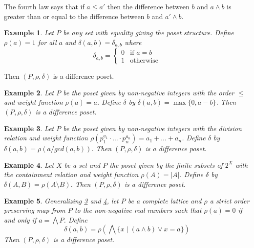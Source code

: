 \documentclass[acmsmall,review,anonymous]{acmart}\settopmatter{printfolios=true,printccs=false,printacmref=false}
\newtheorem{example}{Example}
\begin{document}
The fourth law says that if $a \leq a'$ then the difference between $b$
and $a \wedge b$ is greater than or equal to the difference between $b$ and $a'
\wedge b$.
\fi
\begin{example}\label{embedding}
Let $P$ be any set with equality giving the poset structure. Define
$\rho(a) = 1$ for all $a$ and $\delta(a, b) = \delta_{a, b}$ where
$$\delta_{a, b} =
\begin{cases}
0 & \text{if } a = b\\
1 & \text{otherwise}
\end{cases}$$
\end{example}
Then $(P, \rho, \delta)$ is a difference poset.
\begin{example}\label{naturalnumbers}
Let $P$ be the poset given by non-negative integers with the order $\leq$ and
weight function $\rho(a) = a$. Define $\delta$ by $\delta(a, b) = \max\{0,
a-b\}$. Then $(P, \rho, \delta)$ is a difference poset.
\end{example}
\begin{example}\label{divisibility}
Let $P$ be the poset given by non-negative integers with the division
relation and weight function $\rho(p_1^{a_1} \cdot \ldots \cdot p_n^{a_n}) =
a_1 + \ldots + a_n$. Define $\delta$ by $\delta(a, b) = \rho(a/gcd(a, b))$. Then
$(P, \rho, \delta)$ is a difference poset.
\end{example}
\begin{example}\label{boolean}
Let $X$ be a set and $P$ the poset given by the finite subsets of $2^X$ with the
containment relation and weight function $\rho(A) = |A|$. Define $\delta$
by $\delta(A, B) = \rho(A \setminus B)$. Then $(P, \rho, \delta)$ is a
difference poset.
\end{example}
\begin{example}\label{general}
Generalizing \cref{divisibility} and \cref{boolean}, let $P$ be a complete
lattice and $\rho$ a strict order preserving map from $P$ to the non-negative
real numbers such that $\rho(a) = 0$ if and only if $a = \bigwedge P$. Define
$$\delta(a, b) = \rho\left(\bigwedge \{x \; | \; (a \wedge b) \vee x =
a\}\right)$$ Then $(P, \rho, \delta)$ is a difference poset.
\end{example}
\end{document}
